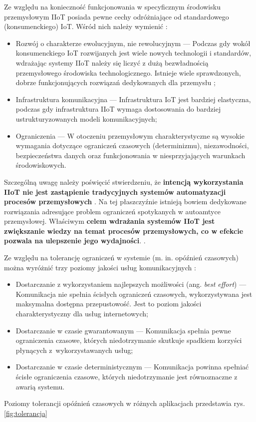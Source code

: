 \documentclass[a4paper, 12pt, twoside]{article}
\begin{document}
Ze względu na konieczność funkcjonowania w specyficznym środowisku przemysłowym
IIoT posiada pewne cechy odróżniające od standardowego (konsumenckiego) IoT.
Wśród nich należy wymienić \cite{iiot-challenges-opportunities-directions}:
\begin{itemize}
    \itemsep0em
    \item Rozwój o charakterze ewolucyjnym, nie rewolucyjnym
          --- Podczas gdy wokół konsumenckiego IoT rozwijanych jest wiele nowych technologii i standardów,
          wdrażając systemy IIoT należy się liczyć z dużą bezwładnością
          przemysłowego środowiska technologicznego. Istnieje wiele sprawdzonych, dobrze
          funkcjonujących rozwiązań dedykowanych dla przemysłu \cite{isp};
    \item Infrastruktura komunikacyjna
          --- Infrastruktura IoT jest bardziej elastyczna, podczas gdy infrastruktura
          IIoT wymaga dostosowania do bardziej ustrukturyzowanych modeli komunikacyjnych;
    \item Ograniczenia
          --- W otoczeniu przemysłowym charakterystyczne są wysokie wymagania dotyczące
          ograniczeń czasowych (determinizmu), niezawodności, bezpieczeństwa danych oraz
          funkcjonowania w niesprzyjających warunkach środowiskowych.
\end{itemize}

Szczególną uwagę należy poświęcić stwierdzeniu, że \textbf{intencją wykorzystania IIoT nie
    jest zastąpienie tradycyjnych systemów automatyzacji procesów przemysłowych} \cite{iiot-challenges-opportunities-directions}.
Na tej płaszczyźnie istnieją bowiem dedykowane rozwiązania adresujące
problem ograniczeń spotykanych w autoamtyce przemysłowej.
Właściwym \textbf{celem wdrażania systemów IIoT jest zwiększanie wiedzy na temat procesów
    przemysłowych, co w efekcie pozwala na ulepszenie jego wydajności}.
\cite{iiot-challenges-opportunities-directions}.

Ze względu na tolerancję ograniczeń w systemie (m. in. opóźnień czasowych) można
wyróżnić trzy poziomy jakości usług komunikacyjnych \cite{iot-hype-to-reality}:
\begin{itemize}
    \itemsep0em
    \item Dostarczanie z wykorzystaniem najlepszych możliwości (ang. \emph{best effort})
          --- Komunikacja nie spełnia ścisłych ograniczeń czasowych, wykorzystywana jest
          maksymalna dostępna przepustowość. Jest to poziom jakości charakterystyczny
          dla usług internetowych;
    \item Dostarczanie w czasie gwarantowanym
          --- Komunikacja spełnia pewne ograniczenia czasowe, których niedotrzymanie
          skutkuje spadkiem korzyści płynących z~wykorzystawanych usług;
    \item Dostarczanie w czasie deterministycznym
          --- Komunikacja powinna spełniać ścisłe ograniczenia czasowe,
          których niedotrzymanie jest równoznaczne z awarią systemu.
\end{itemize}
Poziomy tolerancji opóźnień czasowych w różnych aplikacjach przedstawia rys. \ref{fig:tolerancja}
\end{document}
